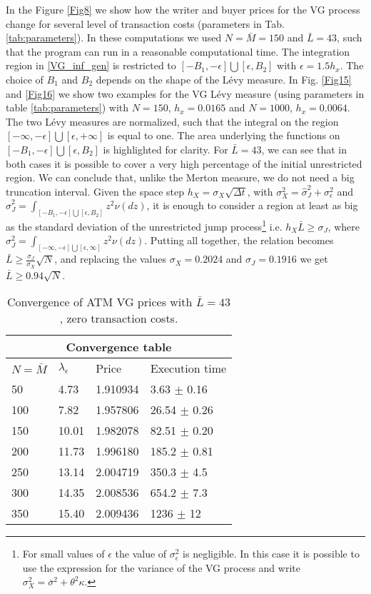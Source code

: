 In the Figure \ref{Fig8} we show how the writer and buyer prices for the VG process change for several level of transaction costs (parameters in Tab. \ref{tab:parameters}). 
In these computations we used $N=\bar M = 150$ and $\bar L = 43$, such that the program can run in a reasonable computational time. 
The integration region in \ref{VG_inf_gen} is restricted to $[-B_1,-\epsilon]\bigcup [\epsilon,B_2]$ with $\epsilon=1.5h_x$. The choice of $B_1$ and $B_2$ depends on the shape of the 
L\'evy measure. 
In Fig. \ref{Fig15} and \ref{Fig16} we show two examples for the VG L\'evy measure (using parameters in table \ref{tab:parameters}) with $N=150$, $h_x=0.0165$ and $N=1000$, $h_x=0.0064$. 
The two L\'evy measures are normalized, such that the integral on the region $[-\infty,-\epsilon]\bigcup [\epsilon,+\infty]$ is equal to one. The 
area underlying the functions on $[-B_1,-\epsilon]\bigcup [\epsilon,B_2]$ is highlighted for clarity.
For $\bar L = 43$, we can see that in both cases it is possible to cover a very high percentage of the initial unrestricted region. We can conclude that, unlike the Merton
measure, we do not need a big truncation interval.
Given the space step $h_X = \sigma_X\sqrt{\Delta t}$, with  
$ \sigma_X^2 = \hat \sigma_{J}^2 + \sigma_{\epsilon}^2 $ and $\hat \sigma_J^2 = \int_{[-B_1,-\epsilon]\bigcup [\epsilon,B_2]} z^2 \nu(dz)$, 
it is enough to consider a region at least as big as the standard deviation  
of the unrestricted jump process\footnote{For small values of $\epsilon$ the value of $\sigma_{\epsilon}^2$ is negligible. In this case it is possible to use the expression for the 
variance of the VG process and write $\sigma_X^2 = \bar \sigma^2 + \theta^2 \kappa$.}
i.e. $h_X \bar L \geq \sigma_J$, where $\sigma_J^2 = \int_{[-\infty,-\epsilon]\bigcup [\epsilon,\infty]} z^2 \nu(dz)$. 
Putting all together, the relation becomes $\bar L\geq \frac{\sigma_J}{\sigma_X} \sqrt{N}$, and replacing the values $\sigma_X = 0.2024$ and $\sigma_J=0.1916$ 
we get $\bar L \geq 0.94 \sqrt{N}$.
\begin{table}[ht]
\centering
 \begin{tabular}{llll}
 \toprule
  \multicolumn{4}{c}{\textbf{Convergence table}} \\
  \midrule
  $N = \bar M$ & $\lambda_{\epsilon}$ & Price & Execution time \\
  \midrule
    50  & 4.73  & 1.910934 & 3.63 $\pm$ 0.16 \\
    100 & 7.82  & 1.957806 & 26.54 $\pm$ 0.26 \\
    150 & 10.01 & 1.982078 & 82.51 $\pm$ 0.20 \\
    200 & 11.73 & 1.996180 & 185.2 $\pm$ 0.81 \\
    250 & 13.14 & 2.004719 & 350.3 $\pm$ 4.5 \\
    300 & 14.35 & 2.008536 & 654.2 $\pm$ 7.3\\ 
    350 & 15.40 & 2.009436 & 1236 $\pm$ 12 \\
  \bottomrule
  \end{tabular}
  \caption{Convergence of ATM VG prices with $\bar L =43$, zero transaction costs.}
  \label{tab:convergence4}
\end{table}

